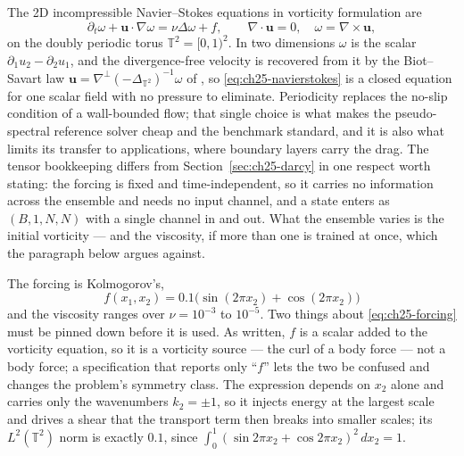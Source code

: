 The 2D incompressible Navier--Stokes equations in vorticity formulation are
\begin{equation}
  \label{eq:ch25-navierstokes}
  \partial_t \omega + \mathbf{u} \cdot \nabla \omega = \nu \Delta \omega + f, \qquad \nabla \cdot \mathbf{u} = 0, \quad \omega = \nabla \times \mathbf{u},
\end{equation}
on the doubly periodic torus $\mathbb{T}^{2} = [0,1)^{2}$. In two dimensions
$\omega$ is the scalar $\partial_1 u_2 - \partial_2 u_1$, and the divergence-free
velocity is recovered from it by the Biot--Savart law
$\mathbf{u} = \nabla^{\perp}(-\Delta_{\mathbb{T}^2})^{-1}\omega$ of
, so
\eqref{eq:ch25-navierstokes} is a closed equation for one scalar field with no
pressure to eliminate. Periodicity replaces the no-slip condition of a wall-bounded
flow; that single choice is what makes the pseudo-spectral reference solver cheap
and the benchmark standard, and it is also what limits its transfer to
applications, where boundary layers carry the drag. The tensor bookkeeping differs
from Section~\ref{sec:ch25-darcy} in one respect worth stating: the forcing is
fixed and time-independent, so it carries no information across the ensemble and
needs no input channel, and a state enters as $(B, 1, N, N)$ with a single channel
in and out. What the ensemble varies is the initial vorticity --- and the viscosity,
if more than one is trained at once, which the paragraph below argues against.

The forcing is Kolmogorov's,
\begin{equation}
  \label{eq:ch25-forcing}
  f(x_1, x_2) = 0.1\big(\sin(2\pi x_2) + \cos(2\pi x_2)\big)
\end{equation}
and the viscosity ranges over $\nu = 10^{-3}$ to $10^{-5}$. Two things about
\eqref{eq:ch25-forcing} must be pinned down before it is used. As written, $f$ is
a scalar added to the vorticity equation,
so it is a vorticity source --- the curl of a body force --- not a body force; a
specification that reports only ``$f$'' lets the two be confused and changes the
problem's symmetry class. The expression depends on $x_2$ alone and carries
only the wavenumbers $k_2 = \pm 1$, so it injects energy at the largest scale and
drives a shear that the transport term then breaks into smaller scales; its
$L^{2}(\mathbb{T}^2)$ norm is exactly $0.1$, since
$\int_0^1 (\sin 2\pi x_2 + \cos 2\pi x_2)^2\,dx_2 = 1$.

